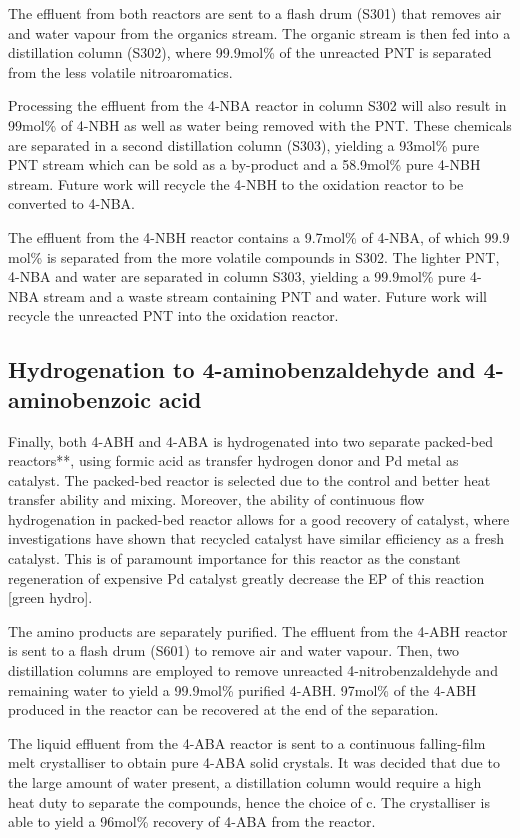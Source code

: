 The effluent from both reactors are sent to a flash drum (S301) that removes air and water vapour from the organics stream. The organic stream is then fed into a distillation column (S302), where 99.9mol\% of the unreacted PNT is separated from the less volatile nitroaromatics. 

Processing the effluent from the 4-NBA reactor in column S302 will also result in 99mol\% of 4-NBH as well as water being removed with the PNT. These chemicals are separated in a second distillation column (S303), yielding a 93mol\% pure PNT stream which can be sold as a by-product and a 58.9mol\% pure 4-NBH stream. Future work will recycle the 4-NBH to the oxidation reactor to be converted to 4-NBA.

The effluent from the 4-NBH reactor contains a 9.7mol\% of 4-NBA, of which 99.9 mol\% is separated from the more volatile compounds in S302. The lighter PNT,  4-NBA and water are separated in column S303, yielding a 99.9mol\% pure 4-NBA stream and a waste stream containing PNT and water. Future work will recycle the unreacted PNT into the oxidation reactor.

\subsection{Hydrogenation to 4-aminobenzaldehyde and 4-aminobenzoic acid}

Finally, both 4-ABH and 4-ABA is hydrogenated into two separate packed-bed reactors**, using formic acid as transfer hydrogen donor and Pd metal as catalyst. The packed-bed reactor is selected due to the control and better heat transfer ability and mixing. Moreover, the ability of continuous flow hydrogenation in packed-bed reactor allows for a good recovery of catalyst, where investigations have shown that recycled catalyst have similar efficiency as a fresh catalyst. This is of paramount importance for this reactor as the constant regeneration of expensive Pd catalyst greatly decrease the EP of this reaction [green hydro]. 

The amino products are separately purified. The effluent from the 4-ABH reactor is sent to a flash drum (S601) to remove air and water vapour. Then, two distillation columns are employed to remove unreacted 4-nitrobenzaldehyde and remaining water to yield a 99.9mol\% purified 4-ABH. 97mol\% of the 4-ABH produced in the reactor can be recovered at the end of the separation.

The liquid effluent from the 4-ABA reactor is sent to a continuous falling-film melt crystalliser to obtain pure 4-ABA solid crystals. It was decided that due to the large amount of water present, a distillation column would require a high heat duty to separate the compounds, hence the choice of c. The crystalliser is able to yield a 96mol\% recovery of 4-ABA from the reactor.

